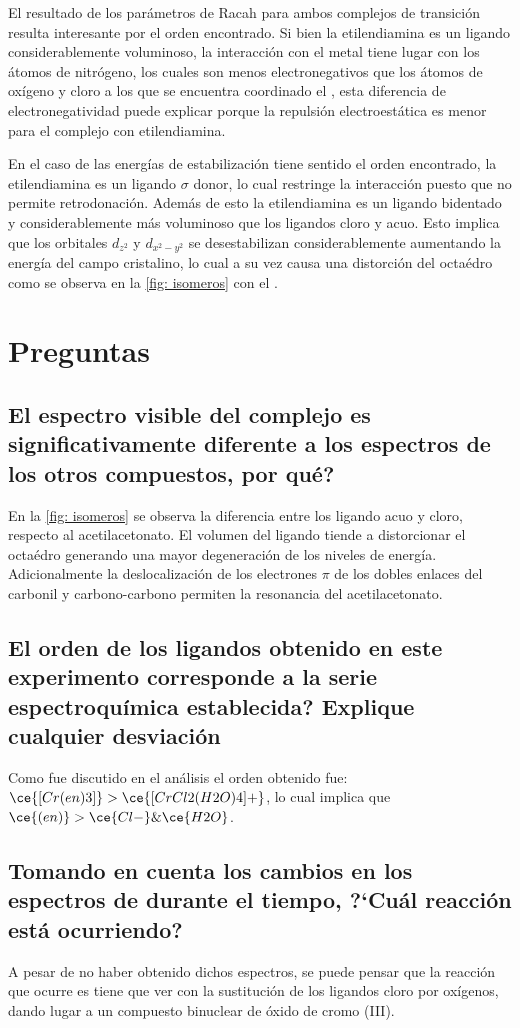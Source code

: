 \documentclass[fleqn,10pt]{SelfArx} %
\begin{document}
	El resultado de los par\'ametros de Racah para ambos complejos de transici\'on resulta interesante por el orden encontrado. Si bien la etilendiamina es un ligando considerablemente voluminoso, la interacci\'on con el metal tiene lugar con los \'atomos de nitr\'ogeno, los cuales son menos electronegativos que los \'atomos de ox\'igeno y cloro a los que se encuentra coordinado el \ce{[CrCl2(H2O)4]+}, esta diferencia de electronegatividad puede explicar porque la repulsi\'on electroest\'atica es menor para el complejo con etilendiamina.
	
	En el caso de las energ\'ias de estabilizaci\'on tiene sentido el orden encontrado, la etilendiamina es un ligando $\sigma$ donor, lo cual restringe la interacci\'on puesto que no permite retrodonaci\'on. Adem\'as de esto la etilendiamina es un ligando bidentado y considerablemente m\'as voluminoso que los ligandos cloro y acuo. Esto implica que los orbitales $d_{z^2}$ y $d_{x^2-y^2}$ se desestabilizan considerablemente aumentando la energ\'ia del campo cristalino, lo cual a su vez causa una distorci\'on del octa\'edro como se observa en la \autoref{fig: isomeros} con el \ce{[Cr(acac)3]}.
	\section{Preguntas}
	\subsection{El espectro visible del complejo  es significativamente diferente a los espectros de los otros compuestos, por qu\'e?}
	En la \autoref{fig: isomeros} se observa la diferencia entre los ligando acuo y cloro, respecto al acetilacetonato. El volumen del ligando tiende a distorcionar el octa\'edro generando una mayor degeneraci\'on de los niveles de energ\'ia. Adicionalmente la deslocalizaci\'on de los electrones $\pi$ de los dobles enlaces del carbonil y carbono-carbono permiten la resonancia del acetilacetonato.
	\subsection{El orden de los ligandos obtenido en este experimento corresponde a la serie espectroqu\'imica establecida? Explique cualquier desviaci\'on}
	Como fue discutido en el an\'alisis el orden obtenido fue: $\ce{[Cr(en)3]} > \ce{[CrCl2(H2O)4]+}$, lo cual implica que $\ce{(en)} > \ce{Cl-} \& \ce{H2O}$. 
	
	\subsection{Tomando en cuenta los cambios en los espectros de  durante el tiempo, ?`Cu\'al reacci\'on est\'a ocurriendo?}
	A pesar de no haber obtenido dichos espectros, se puede pensar que la reacci\'on que ocurre es tiene que ver con la sustituci\'on de los ligandos cloro por ox\'igenos, dando lugar a un compuesto binuclear de \'oxido de cromo (III).
	
\end{document}
